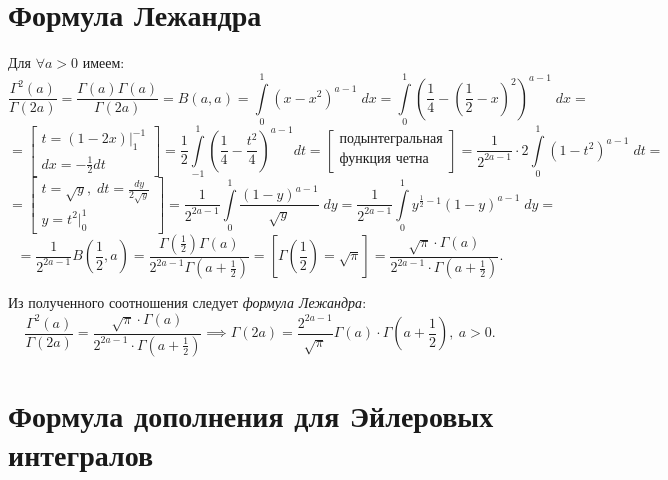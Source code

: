 \documentclass[../../main.tex]{subfiles}
\begin{document}
\section{Формула Лежандра}
	
	Для $\forall a > 0$ имеем:
	\[ \frac{\Gamma^2(a)}{\Gamma(2a)} = \frac{\Gamma(a) \Gamma(a)}{\Gamma(2a)} = 
	B(a,a) = \int\limits_{0}^{1} \left(x-x^2 \right) ^{a-1} \; dx = 
	\int\limits_{0}^{1} \left(\frac{1}{4} - \left( \frac{1}{2} - x\right)^2  
	\right) ^{a-1} \; dx =  \]
	\[  =  \left[  \begin{gathered}
	t = (1-2x) \big|_{1}^{-1} \\
	dx = -\frac{1}{2} dt 
	\end{gathered}   \right] = \frac{1}{2}  \int\limits_{-1}^{1} \left( 
	\frac{1}{4} - \frac{t^2}{4}  \right)^{a-1} dt =\left[ 
	\begin{gathered}
	\text{подынтегральная} \\
	\text{функция четна}
	\end{gathered}	\right] = \frac{1}{2^{2a-1}} \cdot 2 \int\limits_{0}^{1} 
	\left( 
	1-t^2  \right)^{a-1}  \; dt =     \] 
	\[  =  \left[  \begin{gathered}
	t = \sqrt{y}, \; dt = \frac{dy}{2\sqrt{y}} \\
	y = t^2  \big|_{0}^{1}
	\end{gathered}   \right] =  \frac{1}{2^{2a-1}} \int\limits_{0}^{1} 
	\frac{(1-y)^{a-1}}{\sqrt{y}} \; dy  = \frac{1}{2^{2a-1}} \int\limits_{0}^{1} 
	y^{\frac{1}{2} - 1}(1-y)^{a-1} \; dy  =     \]
	\[  = \frac{1}{2^{2a-1}} B\left( \frac{1}{2},a \right) = \frac{\Gamma\left( 
	\frac{1}{2} \right) \Gamma(a) }{2^{2a-1} \Gamma\left( a + \frac{1}{2} 
	\right)} = \left[ \Gamma\left( \frac{1}{2} \right) = \sqrt{\pi}  \right] = 
	\frac{\sqrt{\pi} \cdot \Gamma(a) }{2^{2a-1} \cdot \Gamma\left( a + 
	\frac{1}{2} \right)}. 
	 \]
	
	Из полученного соотношения следует \emph{формула Лежандра}:
	\begin{equation}
	\label{14:13}
	\frac{\Gamma^2(a)}{\Gamma(2a)} = \frac{\sqrt{\pi} \cdot \Gamma(a) }{2^{2a-1} 
	\cdot \Gamma\left( a + \frac{1}{2} \right)} \implies
	\Gamma(2a) = \frac{2^{2a-1}}{\sqrt{\pi}} \Gamma(a) \cdot \Gamma\left(a + 
	\frac{1}{2} 
	\right),\ 
	a > 0.
	\end{equation}
	
	\section{Формула дополнения для Эйлеровых интегралов}
	
\end{document}
